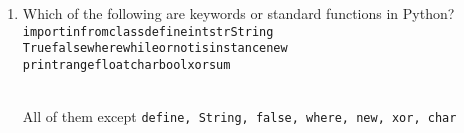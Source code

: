 \begin{enumerate}
\item Which of the following are keywords or standard functions in Python?\\
\texttt{import\hspace{10mm}in\hspace{10mm}from\hspace{10mm}class\hspace{10mm}define\hspace{10mm}int\hspace{10mm}str\hspace{10mm}String}\\
\texttt{True\hspace{9mm}false\hspace{9mm}where\hspace{9mm}while\hspace{9mm}or\hspace{9mm}not\hspace{9mm}isinstance\hspace{9mm}new}\\
\texttt{print\hspace{13mm}range\hspace{13mm}float\hspace{13mm}char\hspace{13mm}bool\hspace{13mm}xor\hspace{13mm}sum}\\
\\
\begin{answer}
All of them except \texttt{define, String, false, where, new, xor, char}
\end{answer}
\end{enumerate}



